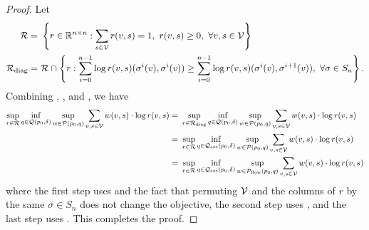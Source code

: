 \begin{proof}
Let 
\begin{align*}
    \mathcal{R} = &~ \left\{r \in \mathbb{R}^{n \times n}: \sum_{s \in \mathcal{V}} r(v,s) = 1, ~r(v,s) \geq 0,~ \forall v,s \in \mathcal{V} \right\}\\
    \mathcal{R}_{\mathrm{diag}} = &~ \mathcal{R} \cap \left\{r:\sum_{i=0}^{n-1} \log r(v,s)(\sigma^i(v),\sigma^i(v)) \geq \sum_{i=0}^{n-1} \log r(v,s)(\sigma^i(v),\sigma^{i+1}(v)), ~\forall \sigma \in S_n \right\}.
\end{align*}
Combining , , and , we have
\begin{align*}
    \sup_{r \in \mathcal{R}} \inf_{q \in \mathcal{Q}(p_0,\delta)} \sup_{w \in \mathcal{P}(p_0,q)} \sum_{v,s \in \mathcal{V}} w(v,s) \cdot \log r(v,s) = &~ \sup_{r \in \mathcal{R}_{\mathrm{diag}}} \inf_{q \in \mathcal{Q}(p_0,\delta)} \sup_{w \in \mathcal{P}(p_0,q)} \sum_{v,s \in \mathcal{V}} w(v,s) \cdot \log r(v,s)\\
    = &~ \sup_{r \in \mathcal{R}} \inf_{q \in \mathcal{Q}_{\mathrm{ext}}(p_0,\delta)} \sup_{w \in \mathcal{P}(p_0,q)} \sum_{v,s \in \mathcal{V}} w(v,s) \cdot \log r(v,s)\\
    = &~ \sup_{r \in \mathcal{R}} \inf_{q \in \mathcal{Q}_{\mathrm{ext}}(p_0,\delta)} \sup_{w \in \mathcal{P}_{\mathrm{flow}}(p_0,q)} \sum_{v,s \in \mathcal{V}} w(v,s) \cdot \log r(v,s)
\end{align*}
where the first step uses  and the fact that permuting $\mathcal{V}$ and the columns of $r$ by the same $\sigma \in S_n$ does not change the objective, the second step uses , and the last step uses . This completes the proof.
\end{proof}

